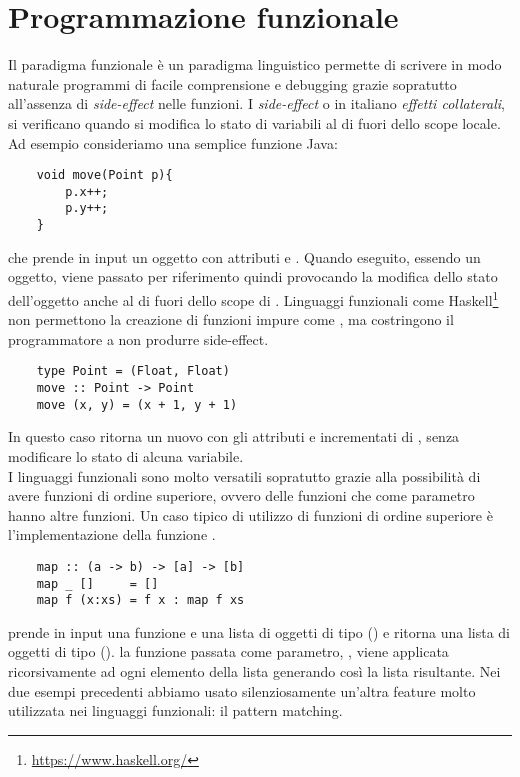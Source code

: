\section{Programmazione funzionale}
Il paradigma funzionale è un paradigma linguistico permette di scrivere in modo naturale programmi di facile comprensione e debugging grazie sopratutto all'assenza di \emph{side-effect} nelle funzioni.
I \emph{side-effect} o in italiano \emph{effetti collaterali}, si verificano quando si modifica lo stato di variabili al di fuori dello scope locale. Ad esempio consideriamo una semplice funzione Java:
\begin{verbatim}
	void move(Point p){
		p.x++;
		p.y++;
	}
\end{verbatim} 
che prende in input un oggetto  con attributi  e . Quando eseguito, essendo  un oggetto, viene passato per riferimento
quindi provocando la modifica dello stato dell'oggetto anche al di fuori dello scope di . Linguaggi funzionali come Haskell\footnote{\url{https://www.haskell.org/}} non
permettono la creazione di funzioni impure come , ma costringono il programmatore a non produrre side-effect.
\begin{verbatim}
	type Point = (Float, Float)
	move :: Point -> Point
	move (x, y) = (x + 1, y + 1)
\end{verbatim}
In questo caso  ritorna un nuovo  con gli attributi  e  incrementati di , senza modificare lo stato di alcuna
variabile.
\\I linguaggi funzionali sono molto versatili sopratutto grazie alla possibilità di avere funzioni di ordine superiore, ovvero delle funzioni che come parametro
hanno altre funzioni. Un caso tipico di utilizzo di funzioni di ordine superiore è l'implementazione della funzione .
\begin{verbatim}
	map :: (a -> b) -> [a] -> [b]
	map _ []     = []
	map f (x:xs) = f x : map f xs
\end{verbatim}
 prende in input una funzione  e una lista di oggetti di tipo  (\code{[a]}) e ritorna una lista di oggetti di tipo  (\code{[b]}). 
la funzione passata come parametro, , viene applicata ricorsivamente ad ogni elemento della lista  generando così la lista risultante. 
Nei due esempi precedenti abbiamo usato silenziosamente un'altra feature molto utilizzata nei linguaggi funzionali: il pattern matching.
